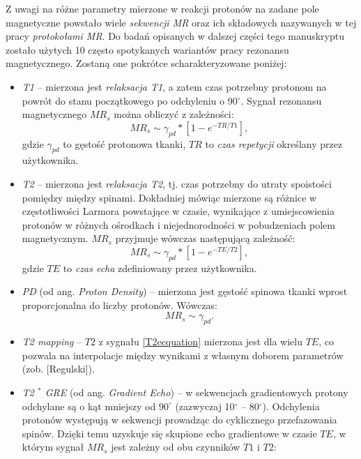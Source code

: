Z uwagi na różne parametry mierzone w reakcji protonów na zadane pole magnetyczne powstało wiele \textit{sekwencji MR} oraz ich składowych nazywanych w tej pracy \textit{protokołami MR}. Do badań opisanych w dalszej części tego manuskryptu zostało użytych 10 często spotykanych wariantów pracy rezonansu magnetycznego. Zostaną one pokrótce scharakteryzowane poniżej:
\begin{itemize}
	\item \textit{T1} -- mierzona jest \textit{relaksacja T1}, a zatem czas potrzebny protonom na powrót do stanu początkowego po odchyleniu o 90$^\circ$. Sygnał rezonansu magnetycznego $MR_s$ można obliczyć z zależności:
	\begin{equation}
		MR_s \sim \gamma_{pd} \ast [1-e^{-TR/T1}],
	\end{equation}
	gdzie $\gamma_{pd}$ to gęstość protonowa tkanki, $TR$ to \textit{czas repetycji} określany przez użytkownika.
	\item \textit{T2} -- mierzona jest \textit{relaksacja T2}, tj. czas potrzebny do utraty spoistości pomiędzy między spinami. Dokładniej mówiąc mierzone są różnice w częstotliwości Larmora powstające w czasie, wynikające z umiejscowienia protonów w różnych ośrodkach i niejednorodności w pobudzeniach polem magnetycznym. $MR_s$ przyjmuje wówczas następującą zależność:
	\begin{equation}
	\label{T2ecquation}
	MR_s \sim \gamma_{pd} \ast [1-e^{-TE/T2}],
	\end{equation}
	gdzie $TE$ to \textit{czas echa} zdefiniowany przez użytkownika.
	\item \textit{PD} (od ang. \textit{Proton Density}) -- mierzona jest gęstość spinowa tkanki wprost proporcjonalna do liczby protonów. Wówczas:
	\begin{equation}
	MR_s \sim \gamma_{pd}.
	\end{equation}
	\item \textit{T2 mapping} -- $T2$ z sygnału \ref{T2ecquation} mierzona jest dla wielu $TE$, co pozwala na interpolacje między wynikami z własnym doborem parametrów (zob. [Regulski]).
	\item \textit{T2 $^\ast$ GRE} (od ang. \textit{Gradient Echo}) -- w sekwencjach gradientowych protony odchylane są o kąt mniejszy od $90^\circ$ (zazwyczaj 10$^\circ$ -- 80$^\circ$). Odchylenia protonów występują w sekwencji prowadząc do cyklicznego przefazowania spinów. Dzięki temu uzyskuje się skupione echo gradientowe w czasie $TE$, w którym sygnał $MR_s$ jest zależny od obu czynników $T1$ i $T2$:
	\begin{equation}

\end{equation}
\end{itemize}
